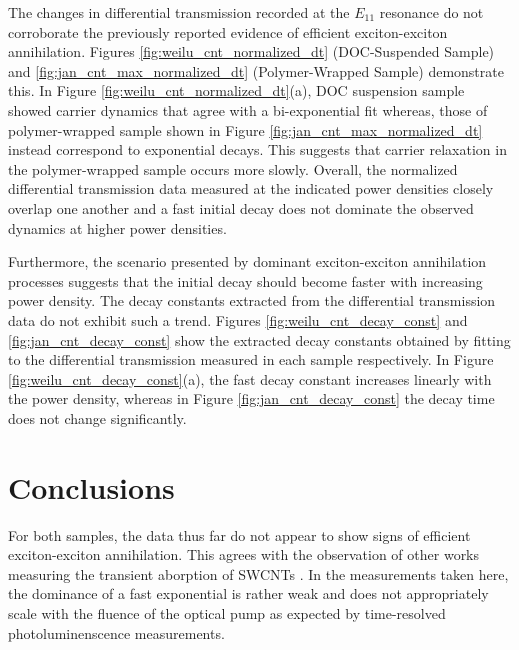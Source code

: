 The changes in differential transmission recorded at the $E_{11}$ resonance do not corroborate the previously reported evidence of efficient exciton-exciton annihilation. Figures \ref{fig:weilu_cnt_normalized_dt} (DOC-Suspended Sample) and \ref{fig:jan_cnt_max_normalized_dt} (Polymer-Wrapped Sample) demonstrate this. In Figure \ref{fig:weilu_cnt_normalized_dt}(a), DOC suspension sample showed carrier dynamics that agree with a bi-exponential fit whereas, those of polymer-wrapped sample shown in Figure \ref{fig:jan_cnt_max_normalized_dt} instead correspond to exponential decays. This suggests that carrier relaxation in the polymer-wrapped sample occurs more slowly. Overall, the normalized differential transmission data measured at the indicated power densities closely overlap one another and a fast initial decay does not dominate the observed dynamics at higher power densities.

Furthermore, the scenario presented by dominant exciton-exciton annihilation processes suggests that the initial decay should become faster with increasing power density. The decay constants extracted from the differential transmission data do not exhibit such a trend. Figures \ref{fig:weilu_cnt_decay_const} and \ref{fig:jan_cnt_decay_const} show the extracted decay constants obtained by fitting to the differential transmission measured in each sample respectively. In Figure \ref{fig:weilu_cnt_decay_const}(a), the fast decay constant increases linearly with the power density, whereas in Figure \ref{fig:jan_cnt_decay_const} the decay time does not change significantly.


\section{Conclusions}

For both samples, the data thus far do not appear to show signs of efficient exciton-exciton annihilation. This agrees with the observation of other works measuring the transient aborption of SWCNTs \cite{ostojic2004interband, manzoni2005intersubband, luer2009size}. In the measurements taken here, the dominance of a fast exponential is rather weak and does not appropriately scale with the fluence of the optical pump as expected by time-resolved photoluminenscence measurements.
